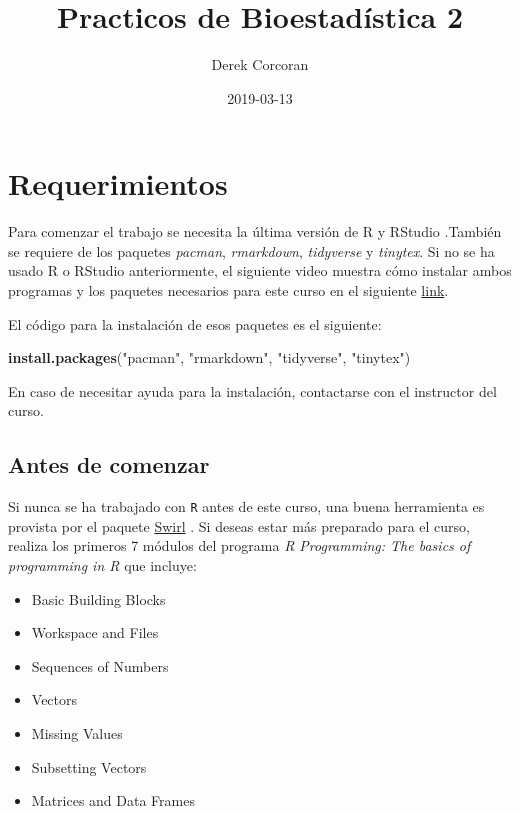 \documentclass[]{book}
\title{Practicos de Bioestadística 2}
\author{Derek Corcoran}
\date{2019-03-13}
\newenvironment{Shaded}{\begin{snugshade}}{\end{snugshade}}
\newcommand{\KeywordTok}[1]{\textcolor[rgb]{0.13,0.29,0.53}{\textbf{#1}}}
\newcommand{\StringTok}[1]{\textcolor[rgb]{0.31,0.60,0.02}{#1}}
\newcommand{\NormalTok}[1]{#1}
\providecommand{\tightlist}{%
  \setlength{\itemsep}{0pt}\setlength{\parskip}{0pt}}
\begin{document}
\maketitle

{
\setcounter{tocdepth}{1}
\tableofcontents
}
\chapter*{Requerimientos}\label{requerimientos}

Para comenzar el trabajo se necesita la última versión de R y RStudio
\citep{R-base}.También se requiere de los paquetes \emph{pacman},
\emph{rmarkdown}, \emph{tidyverse} y \emph{tinytex}. Si no se ha usado R
o RStudio anteriormente, el siguiente video muestra cómo instalar ambos
programas y los paquetes necesarios para este curso en el siguiente
\href{https://youtu.be/RtkCAKXsVbw}{link}.

El código para la instalación de esos paquetes es el siguiente:

\begin{Shaded}
\begin{Highlighting}[]
\KeywordTok{install.packages}\NormalTok{(}\StringTok{"pacman"}\NormalTok{, }\StringTok{"rmarkdown"}\NormalTok{, }\StringTok{"tidyverse"}\NormalTok{, }\StringTok{"tinytex"}\NormalTok{)}
\end{Highlighting}
\end{Shaded}

En caso de necesitar ayuda para la instalación, contactarse con el
instructor del curso.

\section{Antes de comenzar}\label{antes-de-comenzar}

Si nunca se ha trabajado con \texttt{R} antes de este curso, una buena
herramienta es provista por el paquete
\href{http://swirlstats.com/students.html}{Swirl} \citep{Kross2017}. Si
deseas estar más preparado para el curso, realiza los primeros 7 módulos
del programa \emph{R Programming: The basics of programming in R} que
incluye:

\begin{itemize}
\tightlist
\item
  Basic Building Blocks
\item
  Workspace and Files
\item
  Sequences of Numbers
\item
  Vectors
\item
  Missing Values
\item
  Subsetting Vectors
\item
  Matrices and Data Frames
\end{itemize}
\end{document}
